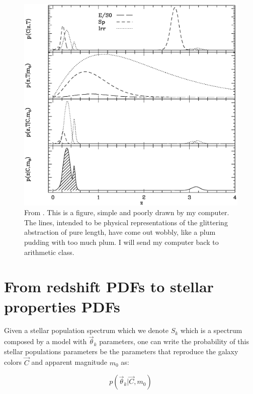 \documentclass[9pt]{memoir}
\begin{document}
\begin{figure}
\begin{adjustwidth*}{1in}{0pt}
\centering
\includegraphics[width=1.3\textwidth]{figures/figpeaks.eps}
\end{adjustwidth*}
\caption{From \cite{Benitez.2000a}. This is a figure, simple and poorly drawn by my computer. The lines, intended to be physical representations of the glittering abstraction of pure length, have come out wobbly, like a plum pudding with too much plum. I will send my computer back to arithmetic class.}
\label{fig:prior}
\end{figure}

\section{From redshift PDFs to stellar properties PDFs}
\label{sec:fit}

Given a stellar population spectrum which we denote $S_k$ which is a spectrum composed by a model with $\vec{\theta}_k$ parameters, one can write the probability of this stellar populations parameters be the parameters that reproduce the galaxy colors $\vec{C}$ and apparent magnitude $m_0$ as:

\begin{equation}
p(\vec{\theta}_k | \vec{C}, m_0)
\end{equation}
\end{document}
